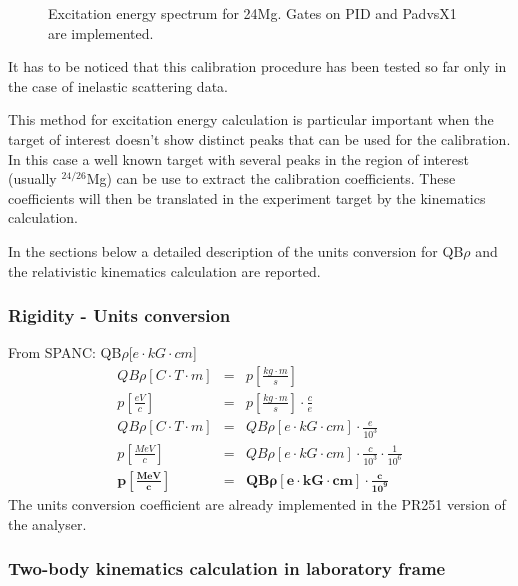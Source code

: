 \documentclass[11pt]{report}
\begin{document}
\begin{figure}
	\centerline{\vspace{0cm}\hspace{0cm}
	}
	\caption{Excitation energy spectrum for 24Mg. Gates on PID and PadvsX1 are implemented.}
	\label{fig:Ex_24Mg}
\end{figure}

It has to be noticed that this calibration procedure has been tested so far only in the case of inelastic scattering data. \par
This method for excitation energy calculation is particular important when the target of interest doesn't show distinct peaks that can be used for the calibration. In this case a well known target with several peaks in the region of interest (usually $^{24/26}$Mg) can be use to extract the calibration coefficients. These coefficients will then be translated in the experiment target by the kinematics calculation.\par
In the sections below a detailed description of the units conversion for QB$\rho$ and the relativistic kinematics calculation are reported.

\subsubsection{Rigidity - Units conversion}

From SPANC: QB$\rho$[$e\cdot kG\cdot cm$]\\
\begin{eqnarray}
QB\rho[C\cdot T\cdot m] &=& p[\frac{kg\cdot m}{s}] \nonumber\\
p[\frac{eV}{c}] &=& p[\frac{kg\cdot m}{s}]\cdot\frac{c}{e}\nonumber\\
QB\rho[C\cdot T\cdot m] &=& QB\rho[e\cdot kG\cdot cm]\cdot\frac{e}{10^3}\nonumber\\
p[\frac{MeV}{c}] &=& QB\rho[e\cdot kG\cdot cm]\cdot\frac{c}{10^3}\cdot\frac{1}{10^6} \nonumber\\
\mathbf{p[\frac{MeV}{c}]} &\mathbf{=}& \mathbf{QB\rho[e\cdot kG\cdot cm]\cdot\frac{c}{10^9}}
\end{eqnarray}
The units conversion coefficient are already implemented in the PR251 version of the analyser. 

\subsubsection{Two-body kinematics calculation in laboratory frame}
\end{document}
